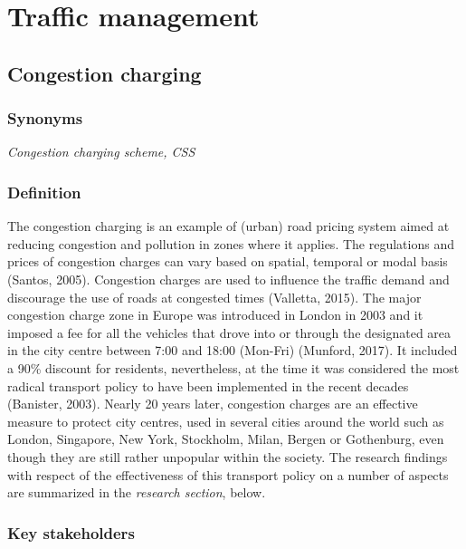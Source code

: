 \documentclass[
]{book}
\begin{document}
\hypertarget{traffic}{%
\chapter{Traffic management}\label{traffic}}

\hypertarget{congestion-charging}{%
\section{Congestion charging}\label{congestion-charging}}

\hypertarget{synonyms-3}{%
\subsection*{Synonyms}\label{synonyms-3}}

\emph{Congestion charging scheme, CSS}

\hypertarget{definition-3}{%
\subsection*{Definition}\label{definition-3}}

The congestion charging is an example of (urban) road pricing system aimed at reducing congestion and pollution in zones where it applies. The regulations and prices of congestion charges can vary based on spatial, temporal or modal basis (Santos, 2005). Congestion charges are used to influence the traffic demand and discourage the use of roads at congested times (Valletta, 2015). The major congestion charge zone in Europe was introduced in London in 2003 and it imposed a fee for all the vehicles that drove into or through the designated area in the city centre between 7:00 and 18:00 (Mon-Fri) (Munford, 2017). It included a 90\% discount for residents, nevertheless, at the time it was considered the most radical transport policy to have been implemented in the recent decades (Banister, 2003). Nearly 20 years later, congestion charges are an effective measure to protect city centres, used in several cities around the world such as London, Singapore, New York, Stockholm, Milan, Bergen or Gothenburg, even though they are still rather unpopular within the society. The research findings with respect of the effectiveness of this transport policy on a number of aspects are summarized in the \emph{research section}, below.

\hypertarget{key-stakeholders-3}{%
\subsection*{Key stakeholders}\label{key-stakeholders-3}}
\end{document}
